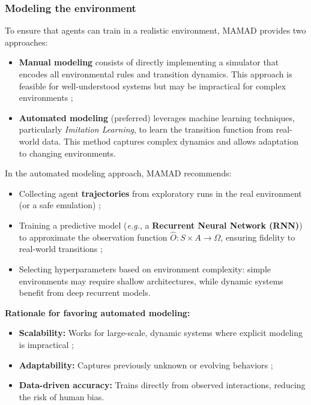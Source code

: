\documentclass[pdflatex,sn-mathphys-num]{sn-jnl}%
\theoremstyle{thmstyleone}%
\theoremstyle{thmstyletwo}%
\theoremstyle{thmstylethree}%
\begin{document}
\subsubsection{Modeling the environment}
To ensure that agents can train in a realistic environment, MAMAD provides two approaches:
\begin{itemize}
    \item \textbf{Manual modeling} consists of directly implementing a simulator that encodes all environmental rules and transition dynamics. This approach is feasible for well-understood systems but may be impractical for complex environments ;
    \item \textbf{Automated modeling} (preferred) leverages machine learning techniques, particularly \textit{Imitation Learning}, to learn the transition function from real-world data. This method captures complex dynamics and allows adaptation to changing environments.
\end{itemize}

In the automated modeling approach, MAMAD recommends:
\begin{itemize}
    \item Collecting agent \textbf{trajectories} from exploratory runs in the real environment (or a safe emulation) ;
    \item Training a predictive model (\textit{e.g.}, a \textbf{Recurrent Neural Network (RNN)}) to approximate the observation function $\hat{O}: S \times A \to \Omega$, ensuring fidelity to real-world transitions ;
    \item Selecting hyperparameters based on environment complexity: simple environments may require shallow architectures, while dynamic systems benefit from deep recurrent models.
\end{itemize}

\noindent \textbf{Rationale for favoring automated modeling:}
\begin{itemize}
    \item \textbf{Scalability:} Works for large-scale, dynamic systems where explicit modeling is impractical ;
    \item \textbf{Adaptability:} Captures previously unknown or evolving behaviors ;
    \item \textbf{Data-driven accuracy:} Trains directly from observed interactions, reducing the risk of human bias.
\end{itemize}
\end{document}
